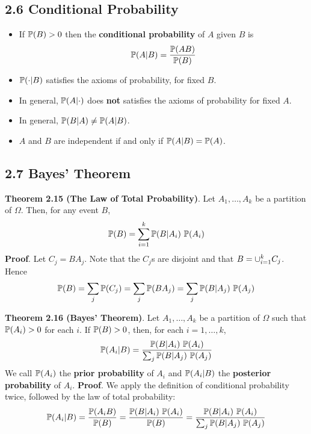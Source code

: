 \subsection*{2.6 Conditional Probability}\label{conditional-probability}
\begin{itemize}
\item
  If \(\operatorname{\mathbb{P}}(B) > 0\) then the \textbf{conditional probability} of
  \(A\) given \(B\) is
  \[
\operatorname{\mathbb{P}}(A | B) = \frac{\operatorname{\mathbb{P}}(AB)}{\operatorname{\mathbb{P}}(B)}
\]
\item
  \(\operatorname{\mathbb{P}}(\cdot | B)\) satisfies the axioms of probability, for
  fixed \(B\). 
\item 
  In general, \(\operatorname{\mathbb{P}}(A | \cdot)\) does \textbf{not}
  satisfies the axioms of probability for fixed \(A\).
\item
  In general, \(\operatorname{\mathbb{P}}(B | A) \neq \operatorname{\mathbb{P}}(A | B)\).
\item
  \(A\) and \(B\) are independent if and only if
  \(\operatorname{\mathbb{P}}(A | B) = \operatorname{\mathbb{P}}(A)\).
\end{itemize}

\subsection*{2.7 Bayes' Theorem}\label{bayes:theorem}

\textbf{Theorem 2.15 (The Law of Total Probability)}. Let
\(A_{1}, \dots, A_{k}\) be a partition of \(\Omega\). Then, for any event
\(B\),
\[
\operatorname{\mathbb{P}}(B) 
= \sum_{i=1}^{k} \operatorname{\mathbb{P}}(B | A_{i}) \, \operatorname{\mathbb{P}}(A_{i}) 
\]
\textbf{Proof}. Let \(C_{j} = BA_{j}\). Note that the \(C_{j}\)s are disjoint
and that \(B = \cup_{i=1}^{k} C_{j}\). Hence
\[
\operatorname{\mathbb{P}}(B) 
= \sum_{j} \operatorname{\mathbb{P}}(C_{j})  
= \sum_{j} \operatorname{\mathbb{P}}(BA_{j}) 
= \sum_{j} \operatorname{\mathbb{P}}(B | A_{j}) \, \operatorname{\mathbb{P}}(A_{j}) 
\]

\textbf{Theorem 2.16 (Bayes' Theorem)}. Let \(A_{1}, \dots, A_{k}\) be a
partition of \(\Omega\) such that \(\operatorname{\mathbb{P}}(A_{i}) > 0\) for each
\(i\). If \(\operatorname{\mathbb{P}}(B) > 0\), then, for each \(i = 1, \dots, k\),
\[
\operatorname{\mathbb{P}}(A_{i} | B) = \frac{\operatorname{\mathbb{P}}(B | A_{i}) \, \operatorname{\mathbb{P}}(A_{i})}{\sum_{j} \operatorname{\mathbb{P}}(B | A_{j}) \, \operatorname{\mathbb{P}}(A_{j})} 
\]
We call \(\operatorname{\mathbb{P}}(A_{i})\) the \textbf{prior probability} of \(A_{i}\)
and \(\operatorname{\mathbb{P}}(A_{i} | B)\) the \textbf{posterior probability} of
\(A_{i}\).
\textbf{Proof}. We apply the definition of conditional probability
twice, followed by the law of total probability:
\[
\operatorname{\mathbb{P}}(A_{i} | B) 
= \frac{\operatorname{\mathbb{P}}(A_{i} B) }{\operatorname{\mathbb{P}}(B)} 
= \frac{\operatorname{\mathbb{P}}(B | A_{i}) \, \operatorname{\mathbb{P}}(A_{i})}{\operatorname{\mathbb{P}}(B)} 
= \frac{\operatorname{\mathbb{P}}(B | A_{i}) \, \operatorname{\mathbb{P}}(A_{i})}{\sum_{j} \operatorname{\mathbb{P}}(B | A_{j}) \, \operatorname{\mathbb{P}}(A_{j})}
\]

